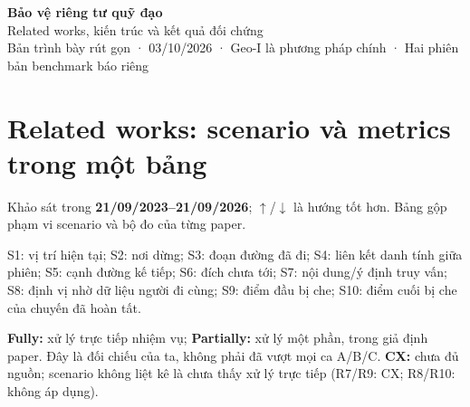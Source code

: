 \documentclass[10pt,a4paper]{article}
\begin{document}
\begin{center}{\LARGE\bfseries\color{ink}Bảo vệ riêng tư quỹ đạo}\\[5pt]{\large Related works, kiến trúc và kết quả đối chứng}\\[4pt]{\small Bản trình bày rút gọn · 03/10/2026 · Geo-I là phương pháp chính · Hai phiên bản benchmark báo riêng}\end{center}
\section{Related works: scenario và metrics trong một bảng}\label{sec:1}
Khảo sát trong \textbf{21/09/2023–21/09/2026}; $\uparrow$/$\downarrow$ là hướng tốt hơn. Bảng gộp phạm vi scenario và bộ đo của từng paper.

S1: vị trí hiện tại; S2: nơi dừng; S3: đoạn đường đã đi; S4: liên kết danh tính giữa phiên; S5: cạnh đường kế tiếp; S6: đích chưa tới; S7: nội dung/ý định truy vấn; S8: định vị nhờ dữ liệu người đi cùng; S9: điểm đầu bị che; S10: điểm cuối bị che của chuyến đã hoàn tất.

\textbf{Fully:} xử lý trực tiếp nhiệm vụ; \textbf{Partially:} xử lý một phần, trong giả định paper. Đây là đối chiếu của ta, không phải đã vượt mọi ca A/B/C. \textbf{CX:} chưa đủ nguồn; scenario không liệt kê là chưa thấy xử lý trực tiếp (R7/R9: CX; R8/R10: không áp dụng).
\end{document}
